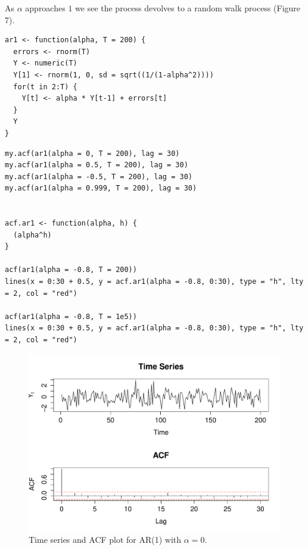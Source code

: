 \documentclass[10pt,a4paper]{article}
\begin{document}
As $\alpha$ approaches $1$ we see the process devolves to a random walk process (Figure 7).

\begin{lstlisting}
ar1 <- function(alpha, T = 200) {
  errors <- rnorm(T)
  Y <- numeric(T)
  Y[1] <- rnorm(1, 0, sd = sqrt((1/(1-alpha^2))))
  for(t in 2:T) {
    Y[t] <- alpha * Y[t-1] + errors[t]
  }
  Y
}
\end{lstlisting}

\begin{lstlisting}
my.acf(ar1(alpha = 0, T = 200), lag = 30)
my.acf(ar1(alpha = 0.5, T = 200), lag = 30)
my.acf(ar1(alpha = -0.5, T = 200), lag = 30)
my.acf(ar1(alpha = 0.999, T = 200), lag = 30)


acf.ar1 <- function(alpha, h) {
  (alpha^h)
}

acf(ar1(alpha = -0.8, T = 200))
lines(x = 0:30 + 0.5, y = acf.ar1(alpha = -0.8, 0:30), type = "h", lty = 2, col = "red")

acf(ar1(alpha = -0.8, T = 1e5))
lines(x = 0:30 + 0.5, y = acf.ar1(alpha = -0.8, 0:30), type = "h", lty = 2, col = "red")

\end{lstlisting}

\begin{figure}[h!]
\includegraphics[width=\linewidth]{plots/p5_alpha0.pdf}
\caption{Time series and ACF plot for AR(1) with $\alpha = 0$.}
\end{figure}
\end{document}
